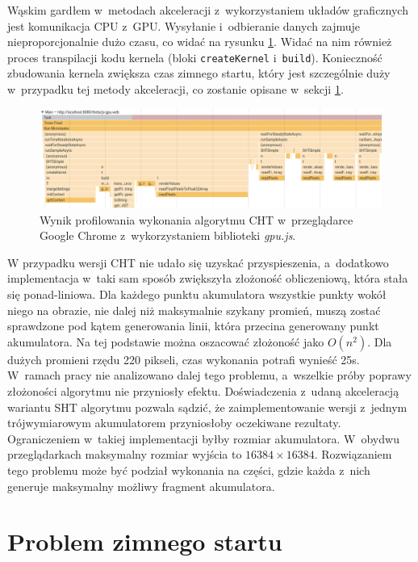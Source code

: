 

Wąskim gardłem w~metodach akceleracji z~wykorzystaniem układów graficznych jest komunikacja CPU z~GPU. Wysyłanie i~odbieranie danych zajmuje nieproporcjonalnie dużo czasu, co widać na rysunku \ref{fig:profiler-gpu}. Widać na nim również proces transpilacji kodu kernela (bloki \lstinline{createKernel} i~\lstinline{build}). Konieczność zbudowania kernela zwiększa czas zimnego startu, który jest szczególnie duży w~przypadku tej metody akceleracji, co zostanie opisane w~sekcji \ref{sec:coldstart}.


\begin{figure}[h]
    \centering
    \includegraphics[width=\linewidth]{img/gpu-profiler.png}
    \caption{Wynik profilowania wykonania algorytmu CHT w~przeglądarce Google Chrome z~wykorzystaniem biblioteki \textit{gpu.js}.}
    \label{fig:profiler-gpu}
\end{figure}


W przypadku wersji CHT nie udało się uzyskać przyspieszenia, a~dodatkowo implementacja w~taki sam sposób zwiększyła złożoność obliczeniową, która stała się ponad-liniowa. Dla każdego punktu akumulatora wszystkie punkty wokół niego na obrazie, nie dalej niż maksymalnie szykany promień, muszą zostać sprawdzone pod kątem generowania linii, która przecina generowany punkt akumulatora. Na tej podstawie można oszacować złożoność jako $O(n^2)$. Dla dużych promieni rzędu 220 pikseli, czas wykonania potrafi wynieść 25s. W~ramach pracy nie analizowano dalej tego problemu, a~wszelkie próby poprawy złożoności algorytmu nie przyniosły efektu. Doświadczenia z~udaną akceleracją wariantu SHT algorytmu pozwala sądzić, że zaimplementowanie wersji z~jednym trójwymiarowym akumulatorem przyniosłoby oczekiwane rezultaty. Ograniczeniem w~takiej implementacji byłby rozmiar akumulatora. W~obydwu przeglądarkach maksymalny rozmiar wyjścia to $16384\times16384$. Rozwiązaniem tego problemu może być podział wykonania na części, gdzie każda z~nich generuje maksymalny możliwy fragment akumulatora.

\section{Problem zimnego startu}
\label{sec:coldstart}

